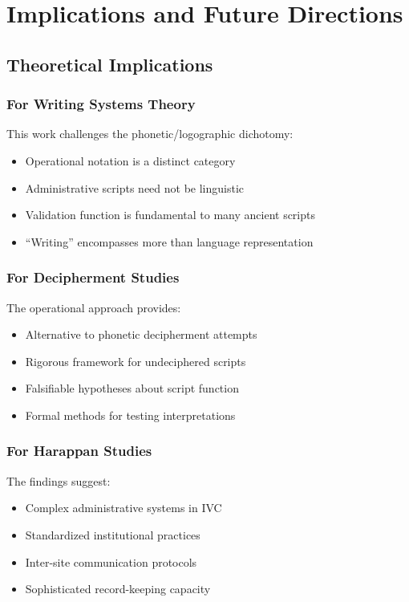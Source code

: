 \section{Implications and Future Directions}

\subsection{Theoretical Implications}

\subsubsection{For Writing Systems Theory}
This work challenges the phonetic/logographic dichotomy:
\begin{itemize}
    \item Operational notation is a distinct category
    \item Administrative scripts need not be linguistic
    \item Validation function is fundamental to many ancient scripts
    \item ``Writing'' encompasses more than language representation
\end{itemize}

\subsubsection{For Decipherment Studies}
The operational approach provides:
\begin{itemize}
    \item Alternative to phonetic decipherment attempts
    \item Rigorous framework for undeciphered scripts
    \item Falsifiable hypotheses about script function
    \item Formal methods for testing interpretations
\end{itemize}

\subsubsection{For Harappan Studies}
The findings suggest:
\begin{itemize}
    \item Complex administrative systems in IVC
    \item Standardized institutional practices
    \item Inter-site communication protocols
    \item Sophisticated record-keeping capacity
\end{itemize}

